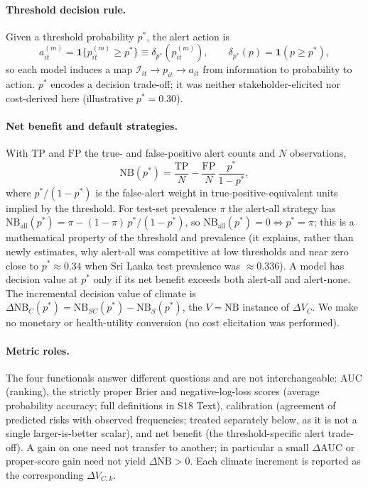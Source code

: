 \documentclass[11pt,a4paper]{article}
\begin{document}
\paragraph{Threshold decision rule.}
Given a threshold probability $p^*$, the alert action is
\[
a^{(m)}_{it}=\mathbf 1\{p^{(m)}_{it}\ge p^*\}\equiv\delta_{p^*}(p^{(m)}_{it}),\qquad \delta_{p^*}(p)=\mathbf 1(p\ge p^*),
\]
so each model induces a map $\mathcal I_{it}\to p_{it}\to a_{it}$ from information to probability to action. $p^*$ encodes a decision trade-off; it was neither stakeholder-elicited nor cost-derived here (illustrative $p^*=0.30$).

\paragraph{Net benefit and default strategies.}
With $\mathrm{TP}$ and $\mathrm{FP}$ the true- and false-positive alert counts and $N$ observations,
\[
\mathrm{NB}(p^*)=\frac{\mathrm{TP}}{N}-\frac{\mathrm{FP}}{N}\,\frac{p^*}{1-p^*},
\]
where $p^*/(1-p^*)$ is the false-alert weight in true-positive-equivalent units implied by the threshold. For test-set prevalence $\pi$ the alert-all strategy has $\mathrm{NB}_{\mathrm{all}}(p^*)=\pi-(1-\pi)\,p^*/(1-p^*)$, so $\mathrm{NB}_{\mathrm{all}}(p^*)=0\iff p^*=\pi$; this is a mathematical property of the threshold and prevalence (it explains, rather than newly estimates, why alert-all was competitive at low thresholds and near zero close to $p^*\approx0.34$ when Sri Lanka test prevalence was $\approx0.336$). A model has decision value at $p^*$ only if its net benefit exceeds both alert-all and alert-none. The incremental decision value of climate is $\Delta\mathrm{NB}_C(p^*)=\mathrm{NB}_{SC}(p^*)-\mathrm{NB}_{S}(p^*)$, the $V=\mathrm{NB}$ instance of $\Delta V_C$. We make no monetary or health-utility conversion (no cost elicitation was performed).

\paragraph{Metric roles.}
The four functionals answer different questions and are not interchangeable: AUC (ranking), the strictly proper Brier and negative-log-loss scores (average probability accuracy; full definitions in S18 Text), calibration (agreement of predicted risks with observed frequencies; treated separately below, as it is not a single larger-is-better scalar), and net benefit (the threshold-specific alert trade-off). A gain on one need not transfer to another; in particular a small $\Delta\mathrm{AUC}$ or proper-score gain need not yield $\Delta\mathrm{NB}>0$. Each climate increment is reported as the corresponding $\Delta V_{C,k}$.
\end{document}
